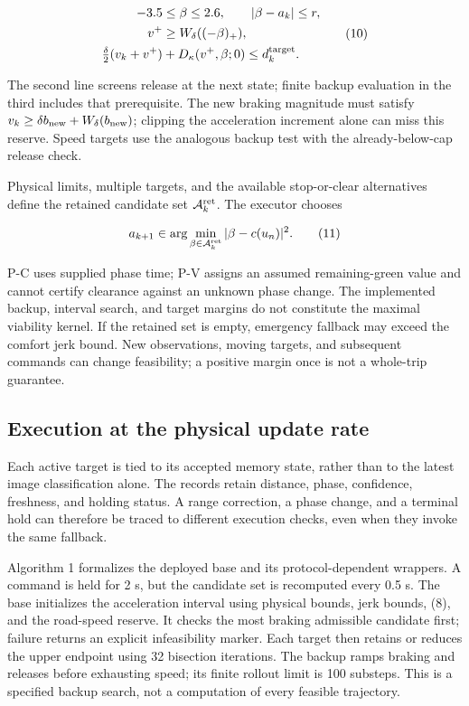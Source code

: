 \documentclass[letterpaper,journal]{IEEEtran}
\begin{document}
\[\begin{aligned}
-3.5&\le\beta\le2.6,\qquad |\beta-a_k|\le r,\\
v^+&\ge W_\delta((-\beta)_+),\\
\tfrac{\delta}{2}(v_k+v^+)&+D_\kappa(v^+,\beta;0)\le d_k^{\rm target}.
\end{aligned}\tag{10}\]

The second line screens release at the next state; finite backup evaluation in the third includes that prerequisite. The new braking magnitude must satisfy \(v_k\ge\delta b_{\rm new}+W_\delta(b_{\rm new})\); clipping the acceleration increment alone can miss this reserve. Speed targets use the analogous backup test with the already-below-cap release check.

Physical limits, multiple targets, and the available stop-or-clear alternatives define the retained candidate set \(\mathcal A_k^{\rm ret}\). The executor chooses

\[a_{k+1}\in\arg\min_{\beta\in\mathcal A_k^{\rm ret}}|\beta-c(u_n)|^2.\tag{11}\]

P-C uses supplied phase time; P-V assigns an assumed remaining-green value and cannot certify clearance against an unknown phase change. The implemented backup, interval search, and target margins do not constitute the maximal viability kernel. If the retained set is empty, emergency fallback may exceed the comfort jerk bound. New observations, moving targets, and subsequent commands can change feasibility; a positive margin once is not a whole-trip guarantee.

\subsection{Execution at the physical update rate}

Each active target is tied to its accepted memory state, rather than to the latest image classification alone. The records retain distance, phase, confidence, freshness, and holding status. A range correction, a phase change, and a terminal hold can therefore be traced to different execution checks, even when they invoke the same fallback.

Algorithm 1 formalizes the deployed base and its protocol-dependent wrappers. A command is held for 2 s, but the candidate set is recomputed every 0.5 s. The base initializes the acceleration interval using physical bounds, jerk bounds, (8), and the road-speed reserve. It checks the most braking admissible candidate first; failure returns an explicit infeasibility marker. Each target then retains or reduces the upper endpoint using 32 bisection iterations. The backup ramps braking and releases before exhausting speed; its finite rollout limit is 100 substeps. This is a specified backup search, not a computation of every feasible trajectory.
\end{document}
